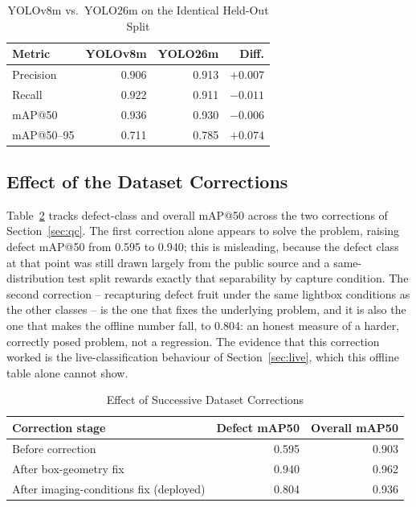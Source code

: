 \documentclass[journal]{IEEEtran}
\begin{document}
\begin{table}[!t]
\caption{YOLOv8m vs.\ YOLO26m on the Identical Held-Out Split}
\label{tab:archcomparison}
\centering
\begin{tabular}{lrrr}
\toprule
\textbf{Metric} & \textbf{YOLOv8m} & \textbf{YOLO26m} & \textbf{Diff.} \\
\midrule
Precision   & 0.906 & 0.913 & $+0.007$ \\
Recall      & 0.922 & 0.911 & $-0.011$ \\
mAP@50      & 0.936 & 0.930 & $-0.006$ \\
mAP@50--95  & 0.711 & 0.785 & $+0.074$ \\
\bottomrule
\end{tabular}
\end{table}

\subsection{Effect of the Dataset Corrections}
\label{sec:corrections}
Table~\ref{tab:corrections} tracks defect-class and overall mAP@50 across the two corrections of Section~\ref{sec:qc}. The first correction alone appears to solve the problem, raising defect mAP@50 from 0.595 to 0.940; this is misleading, because the defect class at that point was still drawn largely from the public source and a same-distribution test split rewards exactly that separability by capture condition. The second correction -- recapturing defect fruit under the same lightbox conditions as the other classes -- is the one that fixes the underlying problem, and it is also the one that makes the offline number fall, to 0.804: an honest measure of a harder, correctly posed problem, not a regression. The evidence that this correction worked is the live-classification behaviour of Section~\ref{sec:live}, which this offline table alone cannot show.

\begin{table}[!t]
\caption{Effect of Successive Dataset Corrections}
\label{tab:corrections}
\centering
\begin{tabular}{p{3.5cm}rr}
\toprule
\textbf{Correction stage} & \textbf{Defect mAP50} & \textbf{Overall mAP50} \\
\midrule
Before correction & 0.595 & 0.903 \\
After box-geometry fix & 0.940 & 0.962 \\
After imaging-conditions fix (deployed) & 0.804 & 0.936 \\
\bottomrule
\end{tabular}
\end{table}
\end{document}
